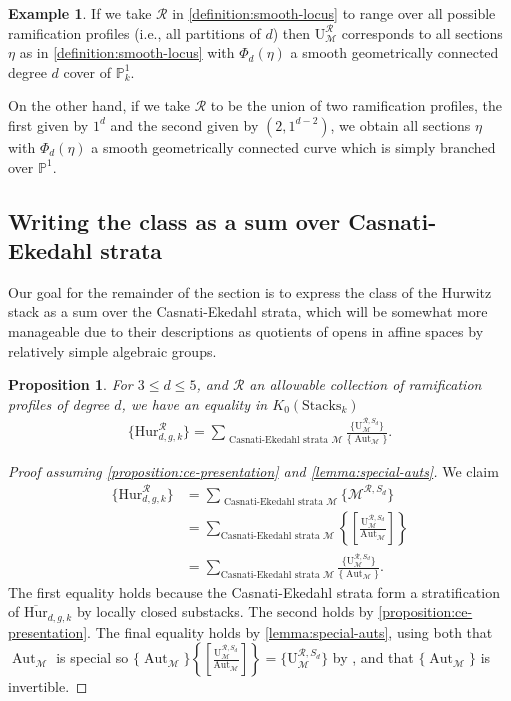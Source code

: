 \documentclass[12 pt]{amsart}
\theoremstyle{plain}
\newtheorem{proposition}[theorem]{Proposition}
\theoremstyle{definition}
\newtheorem{example}[theorem]{Example}
\theoremstyle{remark}
\numberwithin{equation}{section}
\newcommand\bp{\mathbb P}
\newcommand\bighurg[3]{\overline{\mathrm{Hur}}_{#1,#2, #3}} %
\newcommand\rhur[4]{\mathrm{Hur}_{#1,#2,#3}^{#4}} %
\newcommand\ce{\mathscr M} %
\newcommand\rce[1]{\mathscr M^{#1}} %
\newcommand\ramlocus[2]{\mathrm{U}_{#1}^{#2}} %
\newcommand\grStacks{K_0(\mathrm{Stacks}_k)} %
\DeclareMathOperator\aut{Aut}
\begin{document}
\begin{example}
	\label{example:ramification-loci} If we take $\mathcal R$ in
	\autoref{definition:smooth-locus} to range over all possible
	ramification profiles (i.e., all partitions of $d$) then
	$\ramlocus \ce {\mathcal R}$ corresponds to all sections $\eta$
	as in \autoref{definition:smooth-locus} with $\Phi_d(\eta)$ a
	smooth geometrically connected degree $d$ cover of $\bp^1_k$.

	On the other hand, if we take $\mathcal R$ to be the union of two
	ramification profiles, the first given by $1^d$ and the second given by
	$(2, 1^{d-2})$, we obtain all sections $\eta$ with $\Phi_d(\eta)$
	a smooth geometrically connected curve which is simply branched
	over $\bp^1$.  
\end{example}

\subsection{Writing the class as a sum over Casnati-Ekedahl strata}

Our goal for the remainder of the section is to express the class of the Hurwitz
stack as a sum over the Casnati-Ekedahl strata, which will be somewhat more
manageable due to their descriptions as quotients of opens in affine spaces by
relatively simple algebraic groups.

\begin{proposition} \label{proposition:union-of-ce-strata} For $3 \leq d \leq
	5$, and $\mathcal R$ an allowable collection of ramification profiles of
	degree $d$, we have an equality in $\grStacks$ \begin{align*} \{\rhur d g
		k{\mathcal R}\} = \sum_{\text{ Casnati-Ekedahl strata }\ce}
	\frac{\{\ramlocus \ce {\mathcal R, S_d}\}}{\{\aut_{\ce}\}}.  \end{align*}
\end{proposition} 
\begin{proof}[Proof assuming \autoref{proposition:ce-presentation} and
  \autoref{lemma:special-auts}]  
	We claim \begin{align*} \{\rhur d g
			k{\mathcal R}\} &= \sum_{\text{ Casnati-Ekedahl strata
			}\ce} \{\rce {\mathcal R, S_d}\} \\ &= \sum_{\text{
			Casnati-Ekedahl strata }\ce} \left\{\left[\frac{\ramlocus \ce
			{\mathcal R, S_d}}{\aut_{\ce}}\right] \right\} \\ &= \sum_{\text{
		Casnati-Ekedahl strata }\ce} \frac{\{\ramlocus \ce {\mathcal
	R, S_d}\}}{\{\aut_{\ce}\}}.  \end{align*} The first equality holds because the
	Casnati-Ekedahl strata form a stratification of $\bighurg d g k$ by locally
	closed substacks.  The second holds by
	\autoref{proposition:ce-presentation}.  The final equality holds by
	\autoref{lemma:special-auts}, using both that $\aut_{\ce}$ is special so
	$\{\aut_{\ce}\} \left\{\left[\frac{\ramlocus \ce {\mathcal R,
		S_d}}{\aut_{\ce}}\right]\right	\} = \{\ramlocus \ce {\mathcal R, S_d}\}$ by \cite[Prop.\ 1.4(i)]{Ekedahl2009},
	and that $\{\aut_{\ce}\}$ is invertible.  \end{proof}
\end{document}
